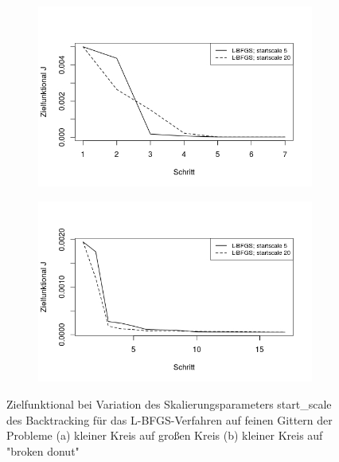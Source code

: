 \begin{figure}
	\begin{subfigure}{0.5\textwidth}
	\centering
	\includegraphics[scale=0.48]{plot_circle_bfgs_fine_startscale.jpeg}
	\caption{}	
	\end{subfigure}
	\begin{subfigure}{0.5\textwidth}
	\centering
	\includegraphics[scale=0.48]{plot_donut_bfgs_fine_startscale.jpeg}
	\caption{}	
	\end{subfigure}
\caption{Zielfunktional bei Variation des Skalierungsparameters \textsf{start\_scale} des Backtracking für das L-BFGS-Verfahren auf feinen Gittern der Probleme
 (a) kleiner Kreis auf großen Kreis (b) kleiner Kreis auf "broken  donut"}
\label{plot_startscales}
\end{figure}

